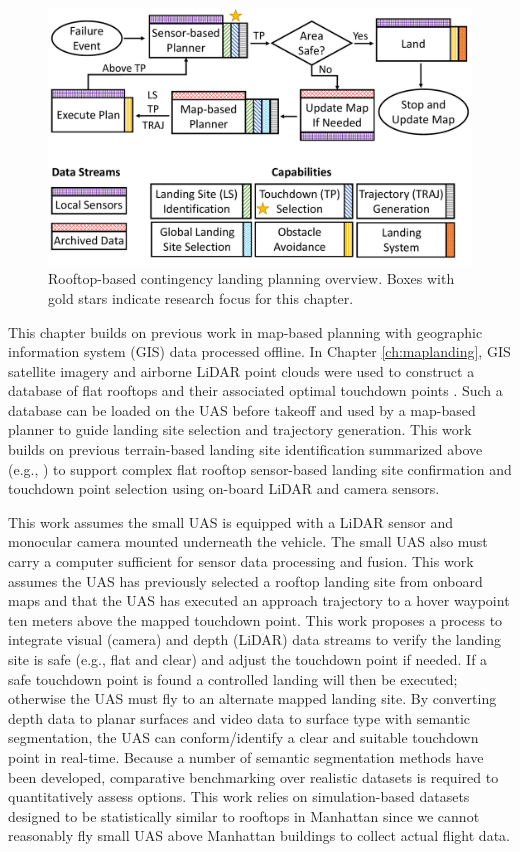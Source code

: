 \begin{figure}[ht!]
\centering
\includegraphics[width=.75\linewidth]{chapter_6_landingsim/figs/problem_statement_overview_2.pdf}
\caption[Rooftop-based contingency landing planning overview]{Rooftop-based contingency landing planning overview. Boxes with gold stars indicate research focus for this chapter. }
\label{fig:ch6_contingency_planning}
\end{figure}

This chapter builds on previous work in map-based planning with geographic information system (GIS) data processed offline. In Chapter \ref{ch:maplanding}, GIS satellite imagery and airborne LiDAR point clouds were used to construct a database of flat rooftops and their associated optimal touchdown points  \cite{castagno_map-based_2021}. Such a database can be loaded on the UAS before takeoff and used by a map-based planner to guide landing site selection and trajectory generation. This work builds on previous terrain-based landing site identification summarized above (e.g., \cite{scherer_autonomous_2012}) to support complex flat rooftop sensor-based landing site confirmation and touchdown point selection using on-board LiDAR and camera sensors.

This work assumes the small UAS is equipped with a LiDAR sensor and monocular camera mounted underneath the vehicle. The small UAS also must carry a computer sufficient for sensor data processing and fusion. This work assumes the UAS has previously selected a rooftop landing site from onboard maps and that the UAS has executed an approach trajectory to a hover waypoint ten meters above the mapped touchdown point. This work proposes a process to integrate visual (camera) and depth (LiDAR) data streams to verify the landing site is safe (e.g., flat and clear) and adjust the touchdown point if needed. If a safe touchdown point is found a controlled landing will then be executed; otherwise the UAS must fly to an alternate mapped landing site.  By converting depth data to planar surfaces and video data to surface type with semantic segmentation, the UAS can conform/identify a clear and suitable touchdown point in real-time. Because a number of semantic segmentation methods have been developed, comparative benchmarking over realistic datasets is required to quantitatively assess options.  This work relies on simulation-based datasets designed to be statistically similar to rooftops in Manhattan since we cannot reasonably fly small UAS above Manhattan buildings to collect actual flight data.

